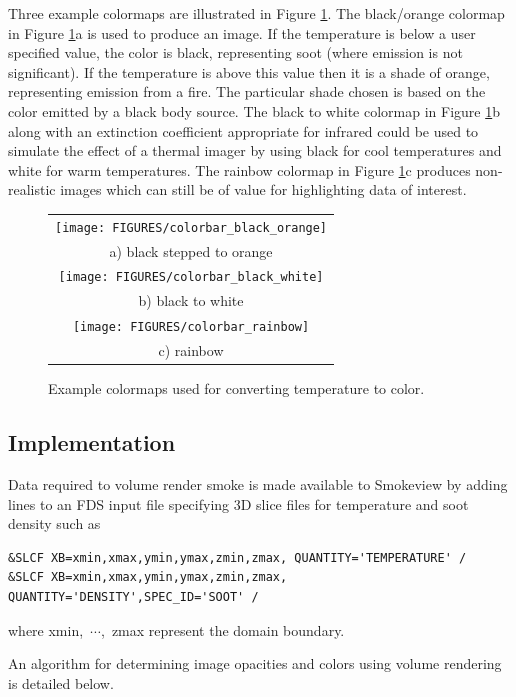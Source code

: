 {Three example colormaps  are illustrated in Figure \ref{fig:colormaps}.
The black/orange colormap in Figure \ref{fig:colormaps}a
is used to produce an image.  If the temperature is below a user specified value, the color is black, representing soot (where emission is not significant).  If the temperature is above this value then it is a shade of orange, representing emission from a fire.  The particular shade chosen is based on the color emitted by a black body source.
The black to white colormap in Figure \ref{fig:colormaps}b along with an extinction coefficient appropriate for infrared could be used to simulate the effect of a thermal imager by using black for cool temperatures and white for warm temperatures.
The rainbow colormap in Figure \ref{fig:colormaps}c produces non-realistic images which can still be of value for highlighting data of interest.

\begin{figure}[\figoptions]
\begin{center}
\begin{tabular}{c}
\texttt{[image: FIGURES/colorbar\_black\_orange]}\\
a) black stepped to orange\\
\texttt{[image: FIGURES/colorbar\_black\_white]}\\
b) black to white\\
\texttt{[image: FIGURES/colorbar\_rainbow]}\\
c) rainbow
\end{tabular}
\end{center}
\caption[Example colormaps used for converting temperature to color.]
{Example colormaps used for converting temperature to color.}
\label{fig:colormaps}
\end{figure}

\subsection{Implementation}
Data required to volume render smoke is made available to Smokeview by adding lines to an FDS input file specifying 3D slice files for temperature and soot density such as
\begin{lstlisting}
&SLCF XB=xmin,xmax,ymin,ymax,zmin,zmax, QUANTITY='TEMPERATURE' /
&SLCF XB=xmin,xmax,ymin,ymax,zmin,zmax, QUANTITY='DENSITY',SPEC_ID='SOOT' /
\end{lstlisting}
where xmin,~$\cdots$,~zmax represent the domain boundary.

An algorithm for determining image opacities and colors using volume rendering is detailed below.

}
